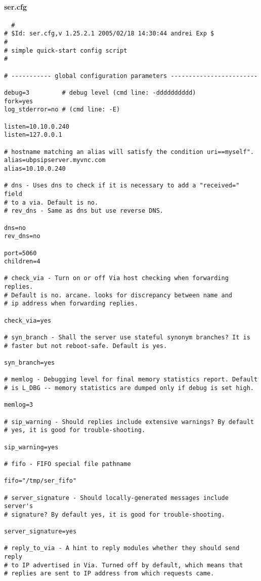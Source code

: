 \documentclass[a4paper,12pt]{report}
\newenvironment{myscriptlisting}
{\begin{list}{}{\setlength{\leftmargin}{1em}}\item\scriptsize\bfseries}
{\end{list}}
\begin{document}
\paragraph{ser.cfg}
\begin{myscriptlisting}
 \begin{verbatim}
  #
# $Id: ser.cfg,v 1.25.2.1 2005/02/18 14:30:44 andrei Exp $
#
# simple quick-start config script
#

# ----------- global configuration parameters ------------------------

debug=3         # debug level (cmd line: -dddddddddd)
fork=yes
log_stderror=no	# (cmd line: -E)

listen=10.10.0.240
listen=127.0.0.1

# hostname matching an alias will satisfy the condition uri==myself".
alias=ubpsipserver.myvnc.com
alias=10.10.0.240

# dns - Uses dns to check if it is necessary to add a "received=" field
# to a via. Default is no.
# rev_dns - Same as dns but use reverse DNS.

dns=no
rev_dns=no

port=5060
children=4

# check_via - Turn on or off Via host checking when forwarding replies.
# Default is no. arcane. looks for discrepancy between name and
# ip address when forwarding replies.

check_via=yes

# syn_branch - Shall the server use stateful synonym branches? It is
# faster but not reboot-safe. Default is yes.

syn_branch=yes

# memlog - Debugging level for final memory statistics report. Default
# is L_DBG -- memory statistics are dumped only if debug is set high.

memlog=3

# sip_warning - Should replies include extensive warnings? By default
# yes, it is good for trouble-shooting.

sip_warning=yes

# fifo - FIFO special file pathname

fifo="/tmp/ser_fifo"

# server_signature - Should locally-generated messages include server's
# signature? By default yes, it is good for trouble-shooting.

server_signature=yes

# reply_to_via - A hint to reply modules whether they should send reply
# to IP advertised in Via. Turned off by default, which means that
# replies are sent to IP address from which requests came.


\end{verbatim}
\end{myscriptlisting}
\end{document}
